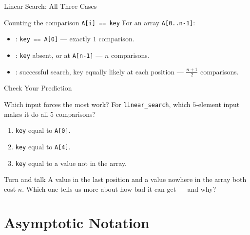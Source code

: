 \documentclass[aspectratio=169]{beamer}
\begin{document}
\begin{frame}{Linear Search: All Three Cases}
  \begin{block}{Counting the comparison \texttt{A[i] == key}}
    For an array \texttt{A[0..n-1]}:
  \end{block}
  \begin{itemize}
    \item {}: \texttt{key == A[0]} --- exactly $1$ comparison.
    \item {}: \texttt{key} absent, or at \texttt{A[n-1]} --- $n$ comparisons.
    \item {}: successful search, key equally likely at each
      position --- $\frac{n+1}{2}$ comparisons.
  \end{itemize}
  \vspace{0.15cm}
\end{frame}

\begin{frame}{Check Your Prediction}
  \begin{block}{Which input forces the most work?}
    For \texttt{linear\_search}, which $5$-element input makes it do all $5$
    comparisons?
  \end{block}
  \begin{enumerate}
    \item \texttt{key} equal to \texttt{A[0]}.
    \item \texttt{key} equal to \texttt{A[4]}.
    \item \texttt{key} equal to a value not in the array.
  \end{enumerate}
  \begin{exampleblock}{Turn and talk}
    A value in the last position and a value nowhere in the array both cost
    $n$. Which one tells us more about how bad it can get --- and why?
  \end{exampleblock}
\end{frame}


\section{Asymptotic Notation}
\end{document}
